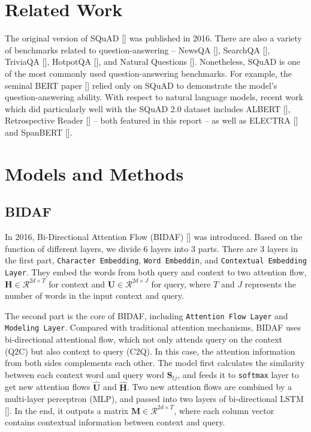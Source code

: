 \documentclass{article}
\begin{document}
\section{Related Work}
    The original version of SQuAD [] was published in 2016.  There are also a variety of benchmarks related to question-answering -- NewsQA [], SearchQA [], TriviaQA [], HotpotQA [], and Natural Questions [].  Nonetheless, SQuAD is one of the most commonly used question-answering benchmarks.  For example, the seminal BERT paper [] relied only on SQuAD to demonstrate the model’s question-answering ability. With respect to natural language models, recent work which did particularly well with the SQuAD 2.0 dataset includes ALBERT [], Retrospective Reader [] -- both featured in this report -- as well as ELECTRA [] and SpanBERT [].


\section{Models and Methods}

\subsection{BIDAF}
    In 2016, Bi-Directional Attention Flow (BIDAF) [] was introduced. Based on the function of different layers, we divide 6 layers into 3 parts. There are 3 layers in the first part, \verb|Character Embedding|, \verb|Word Embeddin|, and \verb|Contextual Embedding Layer|. They embed the words from both query and context to two attention flow,  $\mathbf{H}\in\mathcal{R}^{2d\times T}$ for context and $\mathbf{U}\in\mathcal{R}^{2d\times J}$ for query, where $T$ and $J$ represents the number of words in the input context and query.
    
    The second part is the core of BIDAF, including \verb|Attention Flow Layer| and \verb|Modeling Layer|. Compared with traditional attention mechanisms, BIDAF uses bi-directional attentional flow, which not only attends query on the context (Q2C) but also context to query (C2Q). In this case, the attention information from both sides complements each other. The model first calculates the similarity between each context word and query word $\mathbf{S}_{tj}$,
    and feeds it to \verb|softmax| layer to get new attention flows $\hat{\mathbf{U}}$ and $\hat{\mathbf{H}}$. Two new attention flows are combined by a multi-layer perceptron (MLP), and passed into two layers of bi-directional LSTM []. In the end, it outputs a matrix $\mathbf{M}\in\mathcal{R}^{2d\times T}$, where each column vector contains contextual information between context and query.
    
\end{document}
